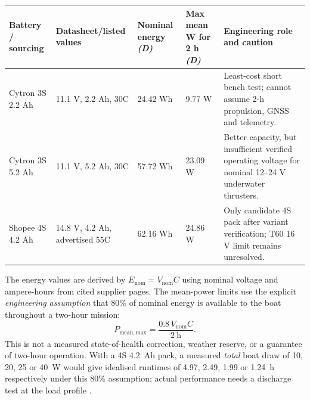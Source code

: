 \begin{center}\small
\begin{tabularx}{\linewidth}{L{25mm}L{28mm}L{22mm}L{25mm}Y}
\toprule Battery / sourcing & Datasheet/listed values & Nominal energy \emph{(D)} & Max mean W for 2 h \emph{(D)} & Engineering role and caution \\\midrule
Cytron 3S 2.2 Ah \cite{bat22} & 11.1 V, 2.2 Ah, 30C & 24.42 Wh & 9.77 W & Least-cost short bench test; cannot assume 2-h propulsion, GNSS and telemetry.\\
Cytron 3S 5.2 Ah \cite{bat52} & 11.1 V, 5.2 Ah, 30C & 57.72 Wh & 23.09 W & Better capacity, but insufficient verified operating voltage for nominal 12--24 V underwater thrusters.\\
Shopee 4S 4.2 Ah \cite{bat4Shopee} & 14.8 V, 4.2 Ah, advertised 55C & 62.16 Wh & 24.86 W & Only candidate 4S pack after variant verification; T60 16 V limit remains unresolved.\\
\bottomrule
\end{tabularx}
\end{center}
The energy values are derived by $E_{\mathrm{nom}}=V_{\mathrm{nom}}C$ using nominal voltage and ampere-hours from cited supplier pages. The mean-power limits use the explicit \emph{engineering assumption} that 80\% of nominal energy is available to the boat throughout a two-hour mission:
\[
  P_{\mathrm{mean,max}}=\frac{0.8\, V_{\mathrm{nom}} C}{2\ \mathrm{h}}.
\]
This is not a measured state-of-health correction, weather reserve, or a guarantee of two-hour operation. With a 4S 4.2~Ah pack, a measured \emph{total} boat draw of 10, 20, 25 or 40~W would give idealised runtimes of 4.97, 2.49, 1.99 or 1.24~h respectively under this 80\% assumption; actual performance needs a discharge test at the load profile \cite{bat4Shopee}.

